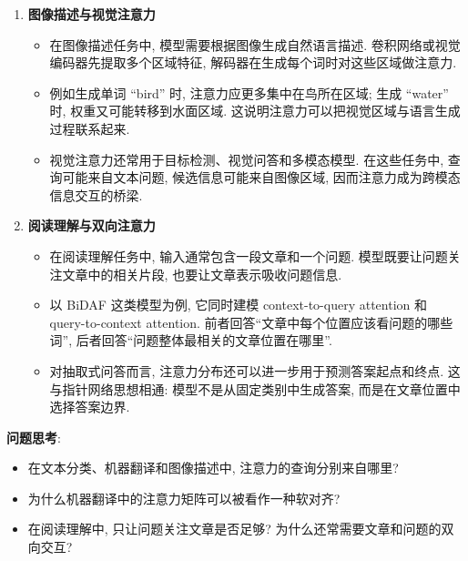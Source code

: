 \documentclass{../nndlcourse}
\begin{document}
\begin{enumerate}
\begin{itemize}
      \begin{equation*}
        \boldsymbol{c}_t = \sum_{i=1}^{N}\alpha_{ti}\boldsymbol{h}_i.
      \end{equation*}
      这样每个目标词都有自己的上下文向量 $\boldsymbol{c}_t$.
      \item 从翻译角度看, 注意力矩阵可以近似反映源语言和目标语言之间的词对齐关系. 传统统计机器翻译也依赖对齐思想, 神经注意力机制则把对齐和翻译放进同一个端到端模型中学习.
    \end{itemize}
  \item \textbf{图像描述与视觉注意力}
    \begin{itemize}
      \item 在图像描述任务中, 模型需要根据图像生成自然语言描述. 卷积网络或视觉编码器先提取多个区域特征, 解码器在生成每个词时对这些区域做注意力.
      \item 例如生成单词 ``bird'' 时, 注意力应更多集中在鸟所在区域; 生成 ``water'' 时, 权重又可能转移到水面区域. 这说明注意力可以把视觉区域与语言生成过程联系起来.
      \item 视觉注意力还常用于目标检测、视觉问答和多模态模型. 在这些任务中, 查询可能来自文本问题, 候选信息可能来自图像区域, 因而注意力成为跨模态信息交互的桥梁.
    \end{itemize}
  \item \textbf{阅读理解与双向注意力}
    \begin{itemize}
      \item 在阅读理解任务中, 输入通常包含一段文章和一个问题. 模型既要让问题关注文章中的相关片段, 也要让文章表示吸收问题信息.
      \item 以 BiDAF 这类模型为例, 它同时建模 context-to-query attention 和 query-to-context attention. 前者回答“文章中每个位置应该看问题的哪些词”, 后者回答“问题整体最相关的文章位置在哪里”.
      \item 对抽取式问答而言, 注意力分布还可以进一步用于预测答案起点和终点. 这与指针网络思想相通: 模型不是从固定类别中生成答案, 而是在文章位置中选择答案边界.
    \end{itemize}
\end{enumerate}

\textbf{问题思考}:
\begin{itemize}
  \item 在文本分类、机器翻译和图像描述中, 注意力的查询分别来自哪里?
  \item 为什么机器翻译中的注意力矩阵可以被看作一种软对齐?
  \item 在阅读理解中, 只让问题关注文章是否足够? 为什么还常需要文章和问题的双向交互?
\end{itemize}
\end{document}

